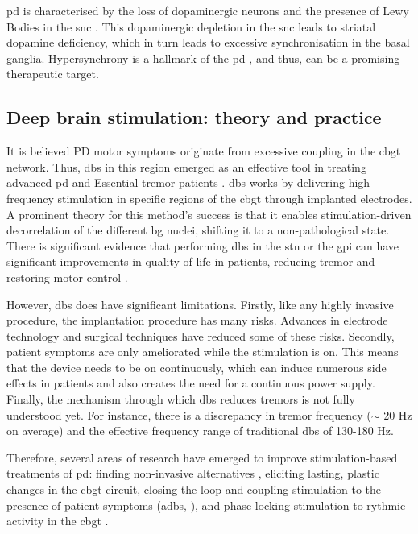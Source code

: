\acrshort{pd} is characterised by the loss of dopaminergic neurons and the presence of
Lewy Bodies in the \acrshort{snc} \cite{del2018advances}. This dopaminergic depletion in the \acrshort{snc} leads to striatal dopamine
deficiency, which in turn leads to excessive synchronisation in the basal ganglia.
Hypersynchrony is a hallmark of the \acrshort{pd} \cite{hammond2007pathological, helmich2012cerebral},
and thus, can be a promising therapeutic target.


\subsection{Deep brain stimulation: theory and practice}
It is believed PD motor symptoms originate from excessive coupling in the \acrshort{cbgt} network.
Thus, \acrshort{dbs} in this region emerged as an effective tool in treating advanced \acrshort{pd} and Essential tremor
patients \cite{del2018advances}.
\acrshort{dbs} works by delivering high-frequency stimulation in specific regions of the \acrshort{cbgt}
through implanted electrodes.
A prominent theory for this method's success is that it enables stimulation-driven
decorrelation of the different \acrshort{bg} nuclei, shifting it to a non-pathological state.
There is significant evidence that performing \acrshort{dbs} in the \acrfull{stn} or the \acrfull{gpi} can have significant improvements in
quality of life in patients, reducing tremor and restoring motor control
\cite{rodriguez2005bilateral, rubin2004high}.

However, \acrshort{dbs} does have significant limitations. Firstly, like any highly invasive procedure, the implantation procedure has many risks.
Advances in electrode technology and surgical techniques have reduced some of these risks.
Secondly, patient symptoms are only ameliorated while the stimulation is on. This means that
the device needs to be on continuously, which can induce numerous side effects in patients and also creates the need for a continuous power supply.
Finally, the mechanism through which \acrshort{dbs} reduces tremors is not fully understood yet.
For instance, there is a discrepancy in tremor frequency ($\sim$ 20 Hz on average) and the effective frequency range of
traditional \acrshort{dbs} of 130-180 Hz.

Therefore, several areas of research have emerged to improve stimulation-based treatments of \acrshort{pd}:
finding non-invasive alternatives \cite{saturnino2017target, schwab2020spike}, eliciting lasting,
plastic changes in the \acrshort{cbgt} circuit, closing the loop and coupling stimulation to the presence of
patient symptoms (\acrfull{adbs}, \cite{beudel2018adaptive}), and phase-locking stimulation to
rythmic activity in the \acrshort{cbgt} \cite{cagnan2017stimulating, west2022stimulating}.

